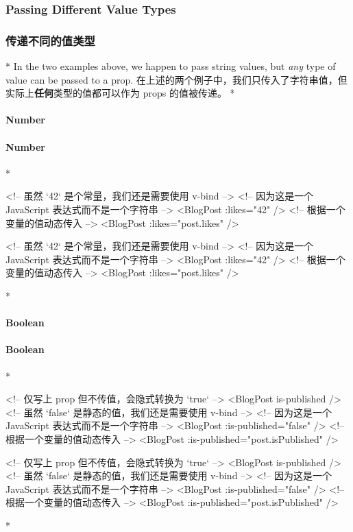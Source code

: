 \begin{paracol}{2}
\subsubsection{Passing Different Value Types}
\switchcolumn
\subsubsection{传递不同的值类型}
\switchcolumn[0]*%
In the two examples above, we happen to pass string values, but
\emph{any} type of value can be passed to a prop.
\switchcolumn
在上述的两个例子中，我们只传入了字符串值，但实际上\textbf{任何}类型的值都可以作为
props 的值被传递。
\switchcolumn[0]*%
\paragraph{Number}
\switchcolumn
\paragraph{Number}
\switchcolumn[0]*%
\begin{codeHtml}
<!-- 虽然 `42` 是个常量，我们还是需要使用 v-bind -->
<!-- 因为这是一个 JavaScript 表达式而不是一个字符串 -->
<BlogPost :likes="42" />
<!-- 根据一个变量的值动态传入 -->
<BlogPost :likes="post.likes" />
\end{codeHtml}
\switchcolumn
\begin{codeHtml}
<!-- 虽然 `42` 是个常量，我们还是需要使用 v-bind -->
<!-- 因为这是一个 JavaScript 表达式而不是一个字符串 -->
<BlogPost :likes="42" />
<!-- 根据一个变量的值动态传入 -->
<BlogPost :likes="post.likes" />
\end{codeHtml}

\switchcolumn[0]*%
\paragraph{Boolean}
\switchcolumn
\paragraph{Boolean}
\switchcolumn[0]*%
\begin{codeHtml}
<!-- 仅写上 prop 但不传值，会隐式转换为 `true` -->
<BlogPost is-published />
<!-- 虽然 `false` 是静态的值，我们还是需要使用 v-bind -->
<!-- 因为这是一个 JavaScript 表达式而不是一个字符串 -->
<BlogPost :is-published="false" />
<!-- 根据一个变量的值动态传入 -->
<BlogPost :is-published="post.isPublished" />
\end{codeHtml}
\switchcolumn
\begin{codeHtml}
<!-- 仅写上 prop 但不传值，会隐式转换为 `true` -->
<BlogPost is-published />
<!-- 虽然 `false` 是静态的值，我们还是需要使用 v-bind -->
<!-- 因为这是一个 JavaScript 表达式而不是一个字符串 -->
<BlogPost :is-published="false" />
<!-- 根据一个变量的值动态传入 -->
<BlogPost :is-published="post.isPublished" />
\end{codeHtml}
\switchcolumn[0]*%

\end{paracol}
